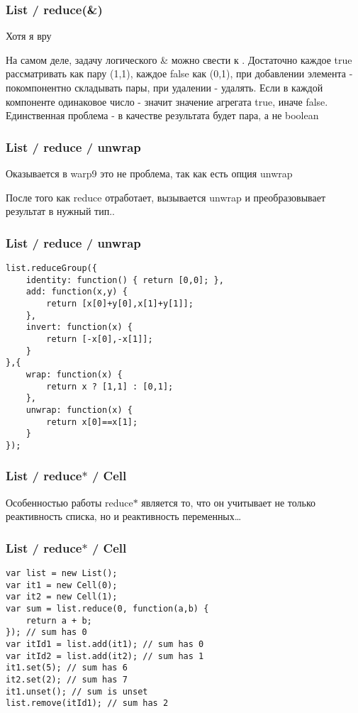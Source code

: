 \documentclass[xetex]{beamer}
\begin{document}
\begin{frame}[fragile]
\frametitle{List / reduce(\&)}
Хотя я вру

\vspace{10mm}
На самом деле, задачу логического \& можно свести к . Достаточно каждое true рассматривать как пару (1,1), каждое false как (0,1), при добавлении элемента - покомпонентно складывать пары, при удалении - удалять. Если в каждой компоненте одинаковое число - значит значение агрегата true, иначе false. Единственная проблема - в качестве результата будет пара, а не boolean
\end{frame}


\begin{frame}[fragile]
\frametitle{List / reduce / unwrap}
Оказывается в warp9 это не проблема, так как есть опция unwrap

\vspace{10mm}

После того как reduce отработает, вызывается unwrap и преобразовывает результат в нужный тип..
\end{frame}


\begin{frame}[fragile]
\frametitle{List / reduce / unwrap}
\begin{lstlisting}[frame=none, xleftmargin=.01\textwidth]
list.reduceGroup({
    identity: function() { return [0,0]; },
    add: function(x,y) { 
        return [x[0]+y[0],x[1]+y[1]]; 
    },
    invert: function(x) { 
        return [-x[0],-x[1]]; 
    }
},{
    wrap: function(x) { 
        return x ? [1,1] : [0,1]; 
    },
    unwrap: function(x) { 
        return x[0]==x[1]; 
    }
});
\end{lstlisting}
\end{frame}


\begin{frame}[fragile]
\frametitle{List / reduce$\ast$ / Cell}
Особенностью работы reduce$\ast$ является то, что он учитывает не только реактивность списка, но и реактивность переменных\dots
\end{frame}


\begin{frame}[fragile]
\frametitle{List / reduce$\ast$ / Cell}
\begin{lstlisting}
var list = new List();
var it1 = new Cell(0);
var it2 = new Cell(1);
var sum = list.reduce(0, function(a,b) { 
    return a + b; 
}); // sum has 0
var itId1 = list.add(it1); // sum has 0
var itId2 = list.add(it2); // sum has 1
it1.set(5); // sum has 6
it2.set(2); // sum has 7
it1.unset(); // sum is unset
list.remove(itId1); // sum has 2
\end{lstlisting}
\end{frame}
\end{document}
